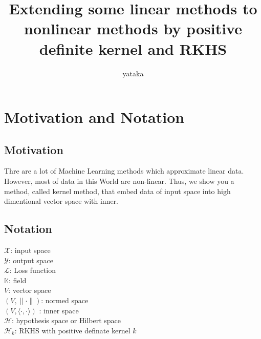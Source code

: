 \documentclass[11pt, a4paper, english, dvipdfmx]{jsarticle}
\title{Extending some linear methods to nonlinear methods by positive definite kernel and RKHS}
\author{yataka}
\date{}
\theoremstyle{definition}
\def\hoge<#1>{\langle #1 \rangle}
\newcommand{\K}{\mathbb{K}}
\newcommand{\X}{\mathcal{X}}
\newcommand{\Y}{\mathcal{Y}}
\newcommand{\Hil}{\mathcal{H}}
\renewcommand{\L}{\mathcal{L}}
\begin{document}
\maketitle
\setcounter{section}{-1}
\section{Motivation and Notation}
\subsection{Motivation}
Thre are a lot of Machine Learning methods which approximate linear data.
However, most of data in this World are non-linear. Thus, we show you a method, called kernel method, that
embed data of input space into high dimentional vector space with inner.
\subsection{Notation}
\noindent
$\X$: input space\\
$\Y$: output space\\
$\L$: Loss function\\
$\K$: field\\
$V$: vector space\\
$(V, \|\cdot\|)$: normed space\\
$(V, \hoge<\cdot, \cdot>)$ : inner space\\
$\Hil$: hypothesis space or Hilbert space\\
$\Hil_{k}$: RKHS with positive definate kernel $k$\\
\end{document}
